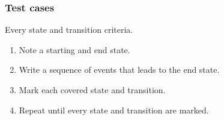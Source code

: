 \begin{frame}
    \frametitle{Test cases}
    Every state and transition criteria.\\
    \begin{enumerate}
        \item Note a starting and end state.
        \item Write a sequence of events that leads to the end state.
        \item Mark each covered state and transition.
        \item Repeat until every state and transition are marked.
    \end{enumerate}
\end{frame}


